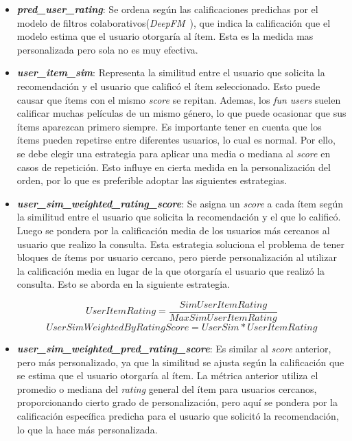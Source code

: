 \documentclass[11pt,a4paper,twoside]{thesis}
\begin{document}
\begin{itemize}
	\item \textbf{\textit{pred\_user\_rating}}: Se ordena según las calificaciones predichas por el modelo de filtros colaborativos(\textit{DeepFM}~\cite{dfmpaper, didldfm}), que indica la calificación que el modelo estima que el usuario otorgaría al ítem. Esta es la medida mas personalizada pero sola no es muy efectiva.

	\item \textbf{\textit{user\_item\_sim}}: Representa la similitud entre el usuario que solicita la recomendación y el usuario que calificó el ítem seleccionado. Esto puede causar que ítems con el mismo \textit{score} se repitan. Ademas, los \textit{fun users} suelen calificar muchas películas de un mismo género, lo que puede ocasionar que sus ítems aparezcan primero siempre. Es importante tener en cuenta que los ítems pueden repetirse entre diferentes usuarios, lo cual es normal. Por ello, se debe elegir una estrategia para aplicar una media o mediana al \textit{score} en casos de repetición. Esto influye en cierta medida en la personalización del orden, por lo que es preferible adoptar las siguientes estrategias.

	\item \textbf{\textit{user\_sim\_weighted\_rating\_score}}: Se asigna un \textit{score} a cada ítem según la similitud entre el usuario que solicita la recomendación y el que lo calificó. Luego se pondera por la calificación media de los usuarios más cercanos al usuario que realizo la consulta. Esta estrategia soluciona el problema de tener bloques de ítems por usuario cercano, pero pierde personalización al utilizar la calificación media en lugar de la que otorgaría el usuario que realizó la consulta. Esto se aborda en la siguiente estrategia.

	      \begin{equation}
		      User Item Rating = \frac{Sim User Item Rating}{Max Sim User Item Rating}
	      \end{equation}
	      \begin{equation}
		      User Sim Weighted By Rating Score = User Sim * User Item Rating
	      \end{equation}

	\item \textbf{\textit{user\_sim\_weighted\_pred\_rating\_score}}: Es similar al \textit{score} anterior, pero más personalizado, ya que la similitud se ajusta según la calificación que se estima que el usuario otorgaría al ítem. La métrica anterior utiliza el promedio o mediana del \textit{rating} general del ítem para usuarios cercanos, proporcionando cierto grado de personalización, pero aquí se pondera por la calificación específica predicha para el usuario que solicitó la recomendación, lo que la hace más personalizada.


\end{itemize}
\end{document}
